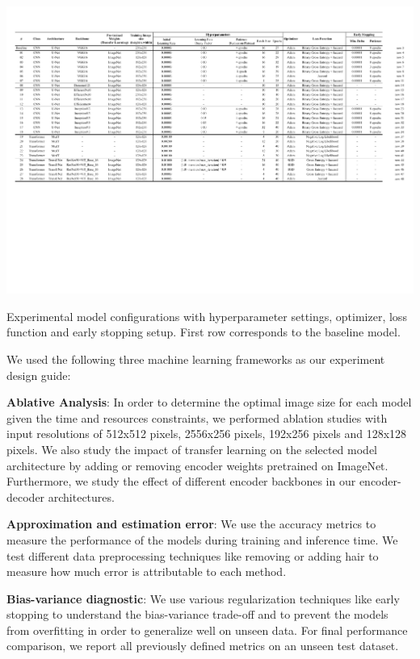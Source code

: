 \begin{table}[ht]
  \centering
  \includegraphics[width=\textwidth]{assets/experiments.pdf}
  \caption[Experiments]{Experimental model configurations with hyperparameter settings, optimizer, loss function and early stopping setup. First row corresponds to the baseline model.}
  \label{table:experiments}
\end{table}

We used the following three machine learning frameworks as our experiment design guide:

\textbf{Ablative Analysis}: In order to determine the optimal image size for each model given the time and resources constraints, we performed ablation studies with input resolutions of 512x512 pixels, 2556x256 pixels, 192x256 pixels and 128x128 pixels. We also study the impact of transfer learning on the selected model architecture by adding or removing encoder weights pretrained on ImageNet. Furthermore, we study the effect of different encoder backbones in our encoder-decoder architectures.

\textbf{Approximation and estimation error}: We use the accuracy metrics to measure the performance of the models during training and inference time. We test different data preprocessing techniques like removing or adding hair to measure how much error is attributable to each method.

\textbf{Bias-variance diagnostic}: We use various regularization techniques like early stopping to understand the bias-variance trade-off and to prevent the models from overfitting in order to generalize well on unseen data. For final performance comparison, we report all previously defined metrics on an unseen test dataset.


